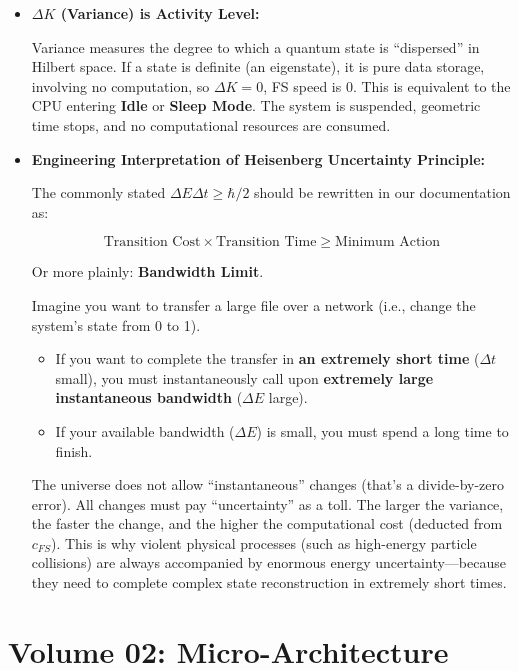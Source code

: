 \documentclass[11pt,a4paper,twoside]{book}
\begin{document}
\begin{itemize}
\item \textbf{$\Delta K$ (Variance) is Activity Level:}

    Variance measures the degree to which a quantum state is ``dispersed'' in Hilbert space. If a state is definite (an eigenstate), it is pure data storage, involving no computation, so \textbf{$\Delta K=0$}, FS speed is 0. This is equivalent to the CPU entering \textbf{Idle} or \textbf{Sleep Mode}. The system is suspended, geometric time stops, and no computational resources are consumed.

\item \textbf{Engineering Interpretation of Heisenberg Uncertainty Principle:}

    The commonly stated \textbf{$\Delta E \Delta t \ge \hbar/2$} should be rewritten in our documentation as:

    $$\text{Transition Cost} \times \text{Transition Time} \ge \text{Minimum Action}$$

    Or more plainly: \textbf{Bandwidth Limit}.

    Imagine you want to transfer a large file over a network (i.e., change the system's state from 0 to 1).

    \begin{itemize}
    \item If you want to complete the transfer in \textbf{an extremely short time} (\textbf{$\Delta t$} small), you must instantaneously call upon \textbf{extremely large instantaneous bandwidth} (\textbf{$\Delta E$} large).

    \item If your available bandwidth (\textbf{$\Delta E$}) is small, you must spend a long time to finish.
    \end{itemize}

    The universe does not allow ``instantaneous'' changes (that's a divide-by-zero error). All changes must pay ``uncertainty'' as a toll. The larger the variance, the faster the change, and the higher the computational cost (deducted from \textbf{$c_{FS}$}). This is why violent physical processes (such as high-energy particle collisions) are always accompanied by enormous energy uncertainty---because they need to complete complex state reconstruction in extremely short times.
\end{itemize}

 
\part{Volume 02: Micro-Architecture}
\end{document}
